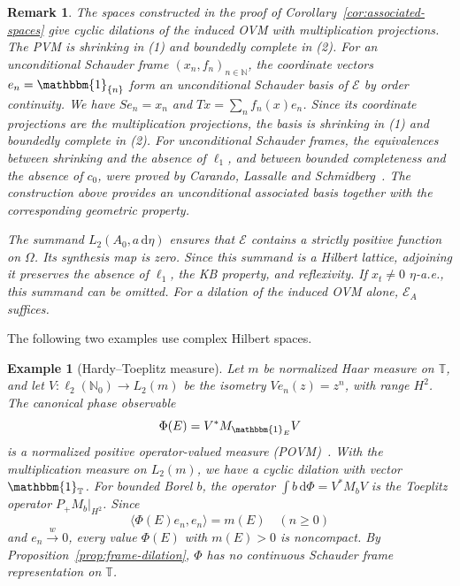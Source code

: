 \documentclass[11pt,leqno]{amsart}
\theoremstyle{compact}
\numberwithin{equation}{section}
\theoremstyle{compactremark}
\newtheorem{example}[theorem]{Example}
\newtheorem{remark}[theorem]{Remark}
\theoremstyle{compact}
\newcommand{\1}{\mathbbm{1}}
\newcommand{\rmd}{\mathrm{d}}
\newcommand{\N}{\mathbb{N}}
\newcommand{\inp}[2]{\langle #1,#2\rangle}
\begin{document}
\begingroup
\begin{remark}\label{rem:associated-zero-set}
The spaces constructed in the proof of Corollary~\ref{cor:associated-spaces} give cyclic dilations of the induced OVM with multiplication projections. The PVM is shrinking in (1) and boundedly complete in (2). For an unconditional Schauder frame $(x_n,f_n)_{n\in\N}$, the coordinate vectors $e_n=\1_{\{n\}}$ form an unconditional Schauder basis of $\mathcal E$ by order continuity. We have $Se_n=x_n$ and $Tx=\sum_nf_n(x)e_n$. Since its coordinate projections are the multiplication projections, the basis is shrinking in (1) and boundedly complete in (2). For unconditional Schauder frames, the equivalences between shrinking and the absence of $\ell_1$, and between bounded completeness and the absence of $c_0$, were proved by Carando, Lassalle and Schmidberg~\cite[Theorems~3.3 and~3.4]{CarandoLassalleSchmidberg2011}. The construction above provides an unconditional associated basis together with the corresponding geometric property.

The summand $L_2(A_0,a\,\rmd\eta)$ ensures that $\mathcal E$ contains a strictly positive function on $\Omega$. Its synthesis map is zero. Since this summand is a Hilbert lattice, adjoining it preserves the absence of $\ell_1$, the KB property, and reflexivity. If $x_t\neq0$ $\eta$-a.e., this summand can be omitted. For a dilation of the induced OVM alone, $\mathcal E_A$ suffices.
\end{remark}
\endgroup

The following two examples use complex Hilbert spaces.

\begin{example}[Hardy--Toeplitz measure]\label{ex:hardy-toeplitz}
Let $m$ be normalized Haar measure on $\mathbb T$, and let $V:\ell_2(\mathbb N_0)\to L_2(m)$ be the isometry $Ve_n(z)=z^n$, with range $H^2$. The canonical phase observable
\[
\Phi(E)=V^*M_{\1_E}V
\]
is a normalized positive operator-valued measure (POVM)~\cite{Pellonpaa2003}. With the multiplication measure on $L_2(m)$, we have a cyclic dilation with vector $\1_{\mathbb T}$. For bounded Borel $b$, the operator $\int b\,\rmd\Phi=V^*M_bV$ is the Toeplitz operator $P_+M_b|_{H^2}$. Since
\[
\inp{\Phi(E)e_n}{e_n}=m(E)\quad(n\geq0)
\]
and $e_n\xrightarrow{w}0$, every value $\Phi(E)$ with $m(E)>0$ is noncompact. By Proposition~\ref{prop:frame-dilation}, $\Phi$ has no continuous Schauder frame representation on $\mathbb T$.
\end{example}
\end{document}

